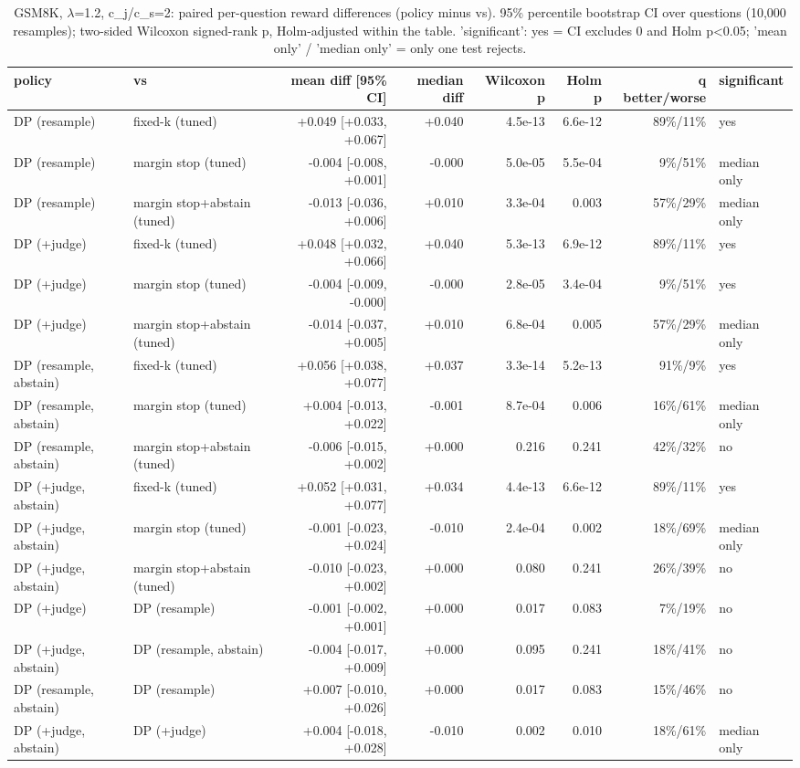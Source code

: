 \begin{table}[t]
\centering
\small
\caption{GSM8K, $\lambda$=1.2, c\_j/c\_s=2: paired per-question reward differences (policy minus vs). 95\% percentile bootstrap CI over questions (10,000 resamples); two-sided Wilcoxon signed-rank p, Holm-adjusted within the table. 'significant': yes = CI excludes 0 and Holm p<0.05; 'mean only' / 'median only' = only one test rejects.}
\label{tab:significance_gsm8k_lam1.2}
\begin{tabular}{llrrrrrl}
\toprule
policy & vs & mean diff [95\% CI] & median diff & Wilcoxon p & Holm p & q better/worse & significant \\
\midrule
DP (resample) & fixed-k (tuned) & +0.049 [+0.033, +0.067] & +0.040 & 4.5e-13 & 6.6e-12 & 89\%/11\% & yes \\
DP (resample) & margin stop (tuned) & -0.004 [-0.008, +0.001] & -0.000 & 5.0e-05 & 5.5e-04 & 9\%/51\% & median only \\
DP (resample) & margin stop+abstain (tuned) & -0.013 [-0.036, +0.006] & +0.010 & 3.3e-04 & 0.003 & 57\%/29\% & median only \\
DP (+judge) & fixed-k (tuned) & +0.048 [+0.032, +0.066] & +0.040 & 5.3e-13 & 6.9e-12 & 89\%/11\% & yes \\
DP (+judge) & margin stop (tuned) & -0.004 [-0.009, -0.000] & -0.000 & 2.8e-05 & 3.4e-04 & 9\%/51\% & yes \\
DP (+judge) & margin stop+abstain (tuned) & -0.014 [-0.037, +0.005] & +0.010 & 6.8e-04 & 0.005 & 57\%/29\% & median only \\
DP (resample, abstain) & fixed-k (tuned) & +0.056 [+0.038, +0.077] & +0.037 & 3.3e-14 & 5.2e-13 & 91\%/9\% & yes \\
DP (resample, abstain) & margin stop (tuned) & +0.004 [-0.013, +0.022] & -0.001 & 8.7e-04 & 0.006 & 16\%/61\% & median only \\
DP (resample, abstain) & margin stop+abstain (tuned) & -0.006 [-0.015, +0.002] & +0.000 & 0.216 & 0.241 & 42\%/32\% & no \\
DP (+judge, abstain) & fixed-k (tuned) & +0.052 [+0.031, +0.077] & +0.034 & 4.4e-13 & 6.6e-12 & 89\%/11\% & yes \\
DP (+judge, abstain) & margin stop (tuned) & -0.001 [-0.023, +0.024] & -0.010 & 2.4e-04 & 0.002 & 18\%/69\% & median only \\
DP (+judge, abstain) & margin stop+abstain (tuned) & -0.010 [-0.023, +0.002] & +0.000 & 0.080 & 0.241 & 26\%/39\% & no \\
DP (+judge) & DP (resample) & -0.001 [-0.002, +0.001] & +0.000 & 0.017 & 0.083 & 7\%/19\% & no \\
DP (+judge, abstain) & DP (resample, abstain) & -0.004 [-0.017, +0.009] & +0.000 & 0.095 & 0.241 & 18\%/41\% & no \\
DP (resample, abstain) & DP (resample) & +0.007 [-0.010, +0.026] & +0.000 & 0.017 & 0.083 & 15\%/46\% & no \\
DP (+judge, abstain) & DP (+judge) & +0.004 [-0.018, +0.028] & -0.010 & 0.002 & 0.010 & 18\%/61\% & median only \\
\bottomrule
\end{tabular}
\end{table}
